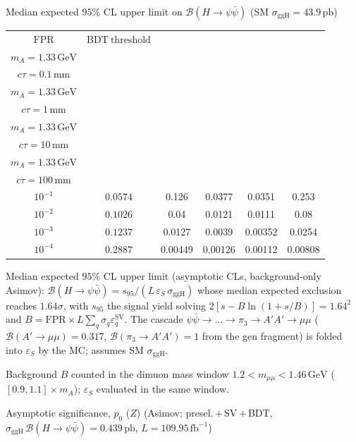 \documentclass[10pt,a4paper]{article}
\begin{document}
{\vspace{12pt}

Median expected $95\%$ CL upper limit on $\mathcal{B}(H\to\psi\bar{\psi})$ (SM $\sigma_{\mathrm{ggH}}=43.9\,\mathrm{pb}$)

\begin{tabular}{cccccc}
\toprule
$\mathrm{FPR}$ & $\mathrm{BDT\ threshold}$ & \shortstack{$m_{\pi}=4\,\mathrm{GeV}$\\$m_{A}=1.33\,\mathrm{GeV}$\\$c\tau=0.1\,\mathrm{mm}$} & \shortstack{$m_{\pi}=4\,\mathrm{GeV}$\\$m_{A}=1.33\,\mathrm{GeV}$\\$c\tau=1\,\mathrm{mm}$} & \shortstack{$m_{\pi}=4\,\mathrm{GeV}$\\$m_{A}=1.33\,\mathrm{GeV}$\\$c\tau=10\,\mathrm{mm}$} & \shortstack{$m_{\pi}=4\,\mathrm{GeV}$\\$m_{A}=1.33\,\mathrm{GeV}$\\$c\tau=100\,\mathrm{mm}$} \\
\midrule
$10^{-1}$ & $0.0574$ & 0.126 & 0.0377 & 0.0351 & 0.253\\
$10^{-2}$ & $0.1026$ & 0.04 & 0.0121 & 0.0111 & 0.08\\
$10^{-3}$ & $0.1237$ & 0.0127 & 0.0039 & 0.00352 & 0.0254\\
$10^{-4}$ & $0.2887$ & 0.00449 & 0.00126 & 0.00112 & 0.00808\\
\bottomrule
\end{tabular}

{\small Median expected $95\%$ CL upper limit (asymptotic CLs, background-only Asimov): $\mathcal{B}(H\to\psi\bar{\psi})=s_{95}/(L\,\varepsilon_S\,\sigma_{\mathrm{ggH}})$ whose median expected exclusion reaches $1.64\sigma$, with $s_{95}$ the signal yield solving $2[s-B\ln(1{+}s/B)]=1.64^2$ and $B=\mathrm{FPR}\times L\sum_q\sigma_q\varepsilon_q^{\mathrm{SV}}$. The cascade $\psi\bar{\psi}\to\ldots\to\pi_3\to A'A'\to\mu\mu$ ($\mathcal{B}(A'\to\mu\mu)=0.317$, $\mathcal{B}(\pi_3\to A'A')=1$ from the gen fragment) is folded into $\varepsilon_S$ by the MC; assumes SM $\sigma_{\mathrm{ggH}}$.}

{\small Background $B$ counted in the dimuon mass window $1.2<m_{\mu\mu}<1.46\,\mathrm{GeV}$ ($[0.9,1.1]\times m_A$); $\varepsilon_S$ evaluated in the same window.}

\vspace{12pt}

Asymptotic significance, $p_0$ ($Z$) (Asimov; presel.\,$+$\,SV\,$+$\,BDT, $\sigma_{\mathrm{ggH}}\,\mathcal{B}(H\to\psi\bar{\psi})=0.439\,\mathrm{pb}$, $L=109.95\,\mathrm{fb}^{-1}$)

}
\end{document}
